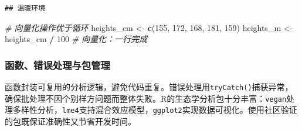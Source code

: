 \documentclass[
  twoside,12pt,fontset=none]{ctexbook}
\newenvironment{Shaded}{\begin{snugshade}}{\end{snugshade}}
\newcommand{\AttributeTok}[1]{\textcolor[rgb]{0.13,0.29,0.53}{#1}}
\newcommand{\CommentTok}[1]{\textcolor[rgb]{0.56,0.35,0.01}{\textit{#1}}}
\newcommand{\ControlFlowTok}[1]{\textcolor[rgb]{0.13,0.29,0.53}{\textbf{#1}}}
\newcommand{\DecValTok}[1]{\textcolor[rgb]{0.00,0.00,0.81}{#1}}
\newcommand{\FloatTok}[1]{\textcolor[rgb]{0.00,0.00,0.81}{#1}}
\newcommand{\FunctionTok}[1]{\textcolor[rgb]{0.13,0.29,0.53}{\textbf{#1}}}
\newcommand{\NormalTok}[1]{#1}
\newcommand{\OtherTok}[1]{\textcolor[rgb]{0.56,0.35,0.01}{#1}}
\newcommand{\SpecialCharTok}[1]{\textcolor[rgb]{0.81,0.36,0.00}{\textbf{#1}}}
\newcommand{\StringTok}[1]{\textcolor[rgb]{0.31,0.60,0.02}{#1}}
\begin{document}
\begin{verbatim}
## 温暖环境
\end{verbatim}

\begin{Shaded}
\begin{Highlighting}[]
\CommentTok{\# 向量化操作优于循环}
\NormalTok{heights\_cm }\OtherTok{\textless{}{-}} \FunctionTok{c}\NormalTok{(}\DecValTok{155}\NormalTok{, }\DecValTok{172}\NormalTok{, }\DecValTok{168}\NormalTok{, }\DecValTok{181}\NormalTok{, }\DecValTok{159}\NormalTok{)}
\NormalTok{heights\_m }\OtherTok{\textless{}{-}}\NormalTok{ heights\_cm }\SpecialCharTok{/} \DecValTok{100}  \CommentTok{\# 向量化：一行完成}
\end{Highlighting}
\end{Shaded}

\hypertarget{ux51fdux6570ux9519ux8befux5904ux7406ux4e0eux5305ux7ba1ux7406}{%
\subsubsection{函数、错误处理与包管理}\label{ux51fdux6570ux9519ux8befux5904ux7406ux4e0eux5305ux7ba1ux7406}}

函数封装可复用的分析逻辑，避免代码重复。错误处理用\texttt{tryCatch()}捕获异常，确保批处理不因个别样方问题而整体失败。R的生态学分析包十分丰富：\texttt{vegan}处理多样性分析，\texttt{lme4}支持混合效应模型，\texttt{ggplot2}实现数据可视化。使用社区验证的包既保证准确性又节省开发时间。

\begin{Shaded}
\end{Shaded}
\end{document}
